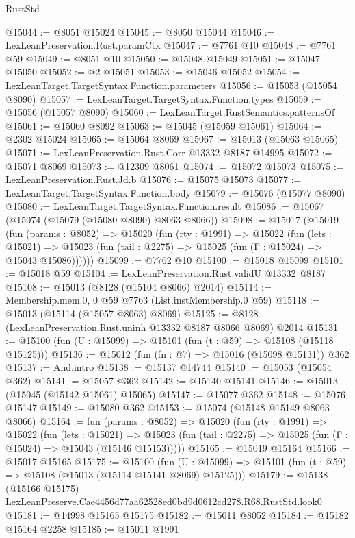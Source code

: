 \begin{lexlean}{RustStd}
\begin{coremodule}
@15044 := @8051 @15024
@15045 := @8050 @15044
@15046 := LexLeanPreservation.Rust.paramCtx
@15047 := @7761 @10
@15048 := @7761 @59
@15049 := @8051 @10
@15050 := @15048 @15049
@15051 := @15047 @15050
@15052 := @2 @15051
@15053 := @15046 @15052
@15054 := LexLeanTarget.TargetSyntax.Function.parameters
@15056 := @15053 (@15054 @8090)
@15057 := LexLeanTarget.TargetSyntax.Function.types
@15059 := @15056 (@15057 @8090)
@15060 := LexLeanTarget.RustSemantics.patternsOf
@15061 := @15060 @8092
@15063 := @15045 (@15059 @15061)
@15064 := @2302 @15024
@15065 := @15064 @8069
@15067 := @15013 (@15063 @15065)
@15071 := LexLeanPreservation.Rust.Corr @13332 @8187 @14995
@15072 := @15071 @8069
@15073 := @12309 @8061
@15074 := @15072 @15073
@15075 := LexLeanPreservation.Rust.Jd.b
@15076 := @15075 @15073
@15077 := LexLeanTarget.TargetSyntax.Function.body
@15079 := @15076 (@15077 @8090)
@15080 := LexLeanTarget.TargetSyntax.Function.result
@15086 := @15067 (@15074 (@15079 (@15080 @8090) @8063 @8066))
@15098 := @15017
    (@15019
      (fun (params : @8052) =>
      @15020
        (fun (rty : @1991) =>
        @15022
          (fun (lets : @15021) =>
          @15023 (fun (tail : @2275) => @15025 (fun (Γ : @15024) => @15043 @15086))))))
@15099 := @7762 @10
@15100 := @15018 @15099
@15101 := @15018 @59
@15104 := LexLeanPreservation.Rust.validU @13332 @8187
@15108 := @15013 (@8128 (@15104 @8066) @2014)
@15114 := Membership.mem.{0, 0} @59 @7763 (List.instMembership.{0} @59)
@15118 := @15013 (@15114 (@15057 @8063) @8069)
@15125 := @8128 (LexLeanPreservation.Rust.uninh @13332 @8187 @8066 @8069) @2014
@15131 := @15100 (fun (U : @15099) => @15101 (fun (t : @59) => @15108 (@15118 @15125)))
@15136 := @15012 (fun (fn : @7) => @15016 (@15098 @15131)) @362
@15137 := And.intro
@15138 := @15137 @14744
@15140 := @15053 (@15054 @362)
@15141 := @15057 @362
@15142 := @15140 @15141
@15146 := @15013 (@15045 (@15142 @15061) @15065)
@15147 := @15077 @362
@15148 := @15076 @15147
@15149 := @15080 @362
@15153 := @15074 (@15148 @15149 @8063 @8066)
@15164 := fun (params : @8052) =>
  @15020
    (fun (rty : @1991) =>
    @15022
      (fun (lets : @15021) =>
      @15023 (fun (tail : @2275) => @15025 (fun (Γ : @15024) => @15043 (@15146 @15153)))))
@15165 := @15019 @15164
@15166 := @15017 @15165
@15175 := @15100
    (fun (U : @15099) => @15101 (fun (t : @59) => @15108 (@15013 (@15114 @15141 @8069) @15125)))
@15179 := @15138 (@15166 @15175) LexLeanPreserve.Cae4456d77aa62528ed0bd9d0612cd278.R68.RustStd.look0
@15181 := @14998 @15165 @15175
@15182 := @15011 @8052
@15184 := @15182 @15164 @2258
@15185 := @15011 @1991

\end{coremodule}
\end{lexlean}
